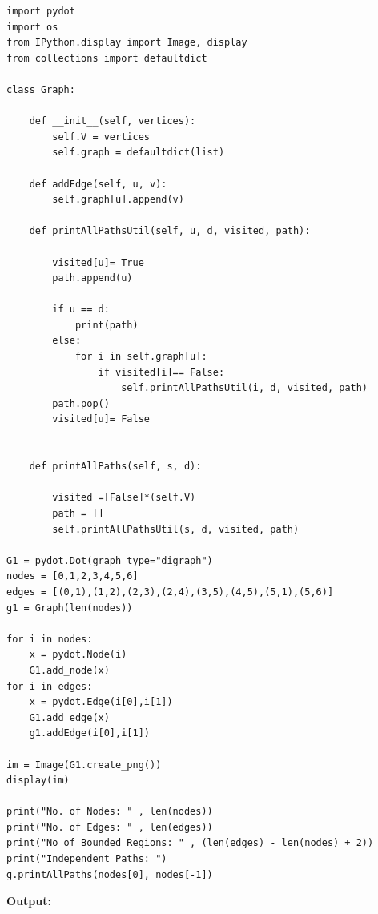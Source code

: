 \documentclass[12pt, letterpaper, twoside]{book}
\begin{document}
\begin{lstlisting}
import pydot
import os
from IPython.display import Image, display
from collections import defaultdict

class Graph: 

    def __init__(self, vertices):  
        self.V = vertices 
        self.graph = defaultdict(list) 

    def addEdge(self, u, v): 
        self.graph[u].append(v) 

    def printAllPathsUtil(self, u, d, visited, path): 

        visited[u]= True
        path.append(u) 

        if u == d: 
            print(path) 
        else: 
            for i in self.graph[u]: 
                if visited[i]== False: 
                    self.printAllPathsUtil(i, d, visited, path) 
        path.pop() 
        visited[u]= False


    def printAllPaths(self, s, d): 

        visited =[False]*(self.V) 
        path = [] 
        self.printAllPathsUtil(s, d, visited, path)

G1 = pydot.Dot(graph_type="digraph")
nodes = [0,1,2,3,4,5,6]
edges = [(0,1),(1,2),(2,3),(2,4),(3,5),(4,5),(5,1),(5,6)]
g1 = Graph(len(nodes))

for i in nodes:
    x = pydot.Node(i)
    G1.add_node(x)
for i in edges:
    x = pydot.Edge(i[0],i[1])
    G1.add_edge(x)
    g1.addEdge(i[0],i[1])

im = Image(G1.create_png())
display(im)

print("No. of Nodes: " , len(nodes))
print("No. of Edges: " , len(edges))
print("No of Bounded Regions: " , (len(edges) - len(nodes) + 2))
print("Independent Paths: ")
g.printAllPaths(nodes[0], nodes[-1])
\end{lstlisting}
\begin{flushleft}
\pagebreak
\textbf{Output:}
\end{flushleft}
\end{document}
